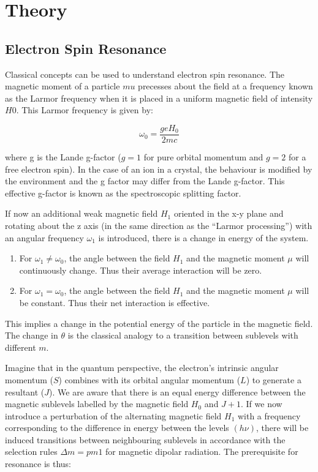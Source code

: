 \section{Theory}

	\subsection{Electron Spin Resonance}

		Classical concepts can be used to understand electron spin resonance. The magnetic moment of a particle $mu$ precesses about the field at a frequency known as the Larmor frequency when it is placed in a uniform magnetic field of intensity $H 0$. This Larmor frequency is given by:

		$$\omega_0 = \frac{geH_0}{2mc}$$

		where g is the Lande g-factor ($g=1$ for pure orbital momentum and $g=2$ for a free electron spin). In the case of an ion in a crystal, the behaviour is modified by the environment and the g factor may differ from the Lande g-factor. This effective g-factor is known as the spectroscopic splitting factor.
		
		If now an additional weak magnetic field $H_1$ oriented in the x-y plane and rotating about the z axis (in the same direction as the ``Larmor processing'') with an angular frequency $\omega_1$ is introduced, there is a change in energy of the system.

		\begin{enumerate}
			\item For $\omega_1 \neq \omega_0$, the angle between the field $H_1$ and the magnetic moment $\mu$ will continuously change. Thus their average interaction will be zero.
			\item For $\omega_1 = \omega_0$, the angle between the field $H_1$ and the magnetic moment $\mu$ will be constant. Thus their net interaction is effective.
		\end{enumerate}

		This implies a change in the potential energy of the particle in the magnetic field. The change in $\theta$ is the classical analogy to a transition between sublevels with different $m$.

		Imagine that in the quantum perspective, the electron's intrinsic angular momentum ($S$) combines with its orbital angular momentum ($L$) to generate a resultant ($J$). We are aware that there is an equal energy difference between the magnetic sublevels labelled by the magnetic field $H_0$ and $J+1$. If we now introduce a perturbation of the alternating magnetic field $H_1$ with a frequency corresponding to the difference in energy between the levels $(h\nu)$, there will be induced transitions between neighbouring sublevels in accordance with the selection rules $\Delta m = pm 1$ for magnetic dipolar radiation. The prerequisite for resonance is thus:

